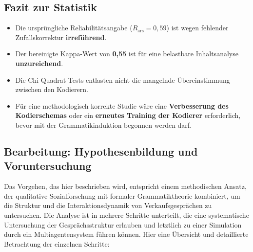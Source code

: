 \documentclass[
]{article}
\begin{document}
\subsection{Fazit zur Statistik}\label{fazit-zur-statistik}

\begin{itemize}
\item Die ursprüngliche Reliabilitätsangabe (\(R_{\text{ars}} = 0{,}59\)) ist wegen fehlender Zufallskorrektur \textbf{irreführend}.
\item Der bereinigte Kappa-Wert von \textbf{0,55} ist für eine belastbare Inhaltsanalyse \textbf{unzureichend}.
\item Die Chi‑Quadrat‑Tests entlasten nicht die mangelnde Übereinstimmung zwischen den Kodierern.
\item Für eine methodologisch korrekte Studie wäre eine \textbf{Verbesserung des Kodierschemas} oder ein \textbf{erneutes Training der Kodierer} erforderlich, bevor mit der Grammatikinduktion begonnen werden darf.
\end{itemize}

\subsection{Bearbeitung: Hypothesenbildung und Voruntersuchung}\label{bearbeitung-hypothesenbildung-und-voruntersuchung}

Das Vorgehen, das hier beschrieben wird, entspricht einem methodischen Ansatz, der qualitative Sozialforschung mit formaler Grammatiktheorie kombiniert, um die Struktur und die Interaktionsdynamik von Verkaufsgesprächen zu untersuchen. Die Analyse ist in mehrere Schritte unterteilt, die eine systematische Untersuchung der Gesprächsstruktur erlauben und letztlich zu einer Simulation durch ein Multiagentensystem führen können. Hier eine Übersicht und detaillierte Betrachtung der einzelnen Schritte:
\end{document}
